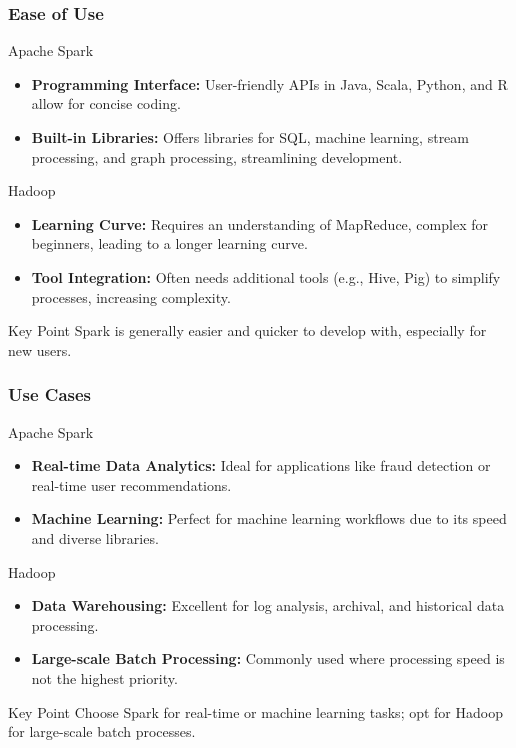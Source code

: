 \documentclass{beamer}
\begin{document}
\begin{frame}[fragile]
    \frametitle{Ease of Use}
    \begin{block}{Apache Spark}
        \begin{itemize}
            \item \textbf{Programming Interface:} User-friendly APIs in Java, Scala, Python, and R allow for concise coding.
            \item \textbf{Built-in Libraries:} Offers libraries for SQL, machine learning, stream processing, and graph processing, streamlining development.
        \end{itemize}
    \end{block}

    \begin{block}{Hadoop}
        \begin{itemize}
            \item \textbf{Learning Curve:} Requires an understanding of MapReduce, complex for beginners, leading to a longer learning curve.
            \item \textbf{Tool Integration:} Often needs additional tools (e.g., Hive, Pig) to simplify processes, increasing complexity.
        \end{itemize}
    \end{block}

    \begin{block}{Key Point}
        Spark is generally easier and quicker to develop with, especially for new users.
    \end{block}
\end{frame}

\begin{frame}[fragile]
    \frametitle{Use Cases}
    \begin{block}{Apache Spark}
        \begin{itemize}
            \item \textbf{Real-time Data Analytics:} Ideal for applications like fraud detection or real-time user recommendations.
            \item \textbf{Machine Learning:} Perfect for machine learning workflows due to its speed and diverse libraries.
        \end{itemize}
    \end{block}

    \begin{block}{Hadoop}
        \begin{itemize}
            \item \textbf{Data Warehousing:} Excellent for log analysis, archival, and historical data processing.
            \item \textbf{Large-scale Batch Processing:} Commonly used where processing speed is not the highest priority.
        \end{itemize}
    \end{block}

    \begin{block}{Key Point}
        Choose Spark for real-time or machine learning tasks; opt for Hadoop for large-scale batch processes.
    \end{block}
\end{frame}
\end{document}
